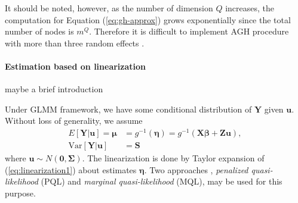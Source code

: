 It should be noted, however, as the number of dimension $Q$ increases, the computation for
Equation (\ref{eq:gh-approx}) grows exponentially since the total number of nodes is $m^Q$. 
Therefore it is difficult to implement AGH procedure with more than three random effects
\citep{bolker2009generalized}.


\paragraph{Estimation based on linearization}\label{para:linearization}


{\large maybe a brief introduction}

Under GLMM framework, we have some conditional distribution of $\bm Y$ given $\bm u$. Without loss
of generality, we assume
\begin{equation}\label{eq:linearization1}
\begin{aligned}
E[\bm Y|\bm u] = \bm \mu &= g^{-1}(\bm \eta) = g^{-1}(\bm{X\beta} + \bm {Zu}), \\
\text{Var}[\bm Y|\bm u]  & = \bm S
\end{aligned}
\end{equation}
where $\bm u \sim N(\bm 0, \bm \Sigma)$.  The linearization is done by Taylor expansion of
(\ref{eq:linearization1}) about estimates $\bm \eta$. Two approaches \citep{breslow1993approximate},
\textit{penalized quasi-likelihood } (PQL) and \textit{marginal quasi-likelihood} (MQL), may be used
for this purpose. 

